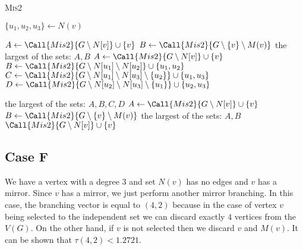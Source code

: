 \begin{algorithm}[H]
\caption{\textsc{Mis2}}\label{mis2:2}
\begin{algorithmic}[1]

        \State $\{u_1, u_2, u_3\} \gets N(v)$

                    \State $A \gets \Call{Mis2}{G\setminus N[v]} \cup \{v\}$
                    \State $B \gets \Call{Mis2}{G\setminus \{v\} \setminus M(v)}$
                    \State \Return the largest of the sets: $A, B$ 
                \Else
                    \State $A \gets \Call{Mis2}{G\setminus N[v]} \cup \{v\}$
                    \State $B \gets \Call{Mis2}{G\setminus N[u_1] \setminus N[u_2]} \cup \{u_1, u_2\}$
                    \State $C \gets \Call{Mis2}{G\setminus N[u_1]  \setminus N[u_3]  \setminus \{u_2\} } \cup \{u_1, u_3\}$
                    \State $D \gets \Call{Mis2}{G\setminus N[u_2]  \setminus N[u_3]  \setminus \{u_1\} } \cup \{u_2, u_3\}$

                    \State \Return the largest of the sets: $A, B, C, D$ 
                \EndIf           
                \State $A \gets \Call{Mis2}{G\setminus N[v]} \cup \{v\}$
                \State $B \gets \Call{Mis2}{G\setminus \{v\} \setminus M(v)}$
                \State \Return the largest of the sets: $A, B$ 
            \Else %
                \State \Return $\Call{Mis2}{G\setminus N[v]} \cup \{v\}$ 
            \EndIf            
    \EndIf
{}
\end{algorithmic}
\end{algorithm}

\subsection{Case F}
We have a vertex with a degree $3$ and set $N(v)$ has no edges and $v$ has a mirror. Since $v$ has a mirror, we just perform another mirror branching. In this case, the branching vector is equal to $(4,2)$ because in the case of vertex $v$ being selected to the independent set we can discard exactly $4$ vertices from the $V(G)$. On the other hand, if $v$ is not selected then we discard $v$ and $M(v)$. It can be shown that $\tau(4,2) < 1.2721$.

